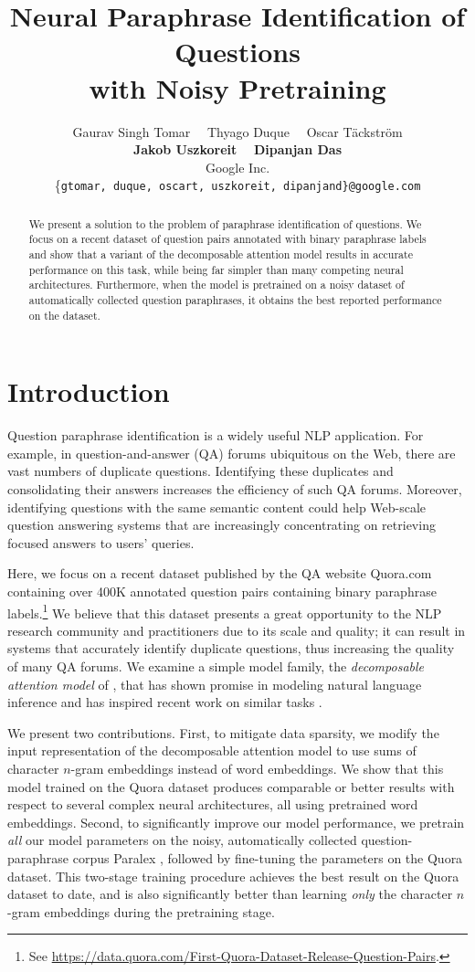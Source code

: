\documentclass[11pt,letterpaper]{article}
\title{Neural Paraphrase Identification of Questions\\with Noisy Pretraining}
\author{Gaurav Singh Tomar \ \ Thyago Duque \ \ Oscar T{\"{a}}ckstr{\"{o}}m \\ {\bf Jakob Uszkoreit} \ \ {\bf Dipanjan Das}\\Google Inc.\\ \{\texttt{gtomar, duque, oscart, uszkoreit, dipanjand\}}\texttt{@google.com}}
\date{}
\begin{document}
\maketitle

\begin{abstract}
We present a solution to the problem of paraphrase identification of questions.
We focus on a recent dataset of question pairs annotated with binary paraphrase labels and show that a variant of the decomposable attention model \cite{parikh.etal.2016} results in accurate performance on this task, while being far simpler than many competing neural architectures.
Furthermore, when the model is pretrained on a noisy dataset of automatically collected question paraphrases, it obtains the best reported performance on the dataset.
\end{abstract}

\section{Introduction}
Question paraphrase identification is a widely useful NLP application.
For example, in question-and-answer (QA) forums ubiquitous on the Web, there are vast numbers of duplicate questions.
Identifying these duplicates and consolidating their answers increases the efficiency of such QA forums.
Moreover, identifying questions with the same semantic content could help Web-scale question answering systems that are increasingly concentrating on retrieving focused answers to users' queries.

Here, we focus on a recent dataset published by the QA website Quora.com containing over 400K annotated question pairs containing binary paraphrase labels.\footnote{See \url{https://data.quora.com/First-Quora-Dataset-Release-Question-Pairs}.}  We believe that this dataset presents a great opportunity to the NLP research community and practitioners due to its scale and quality; it can result in systems that accurately identify duplicate questions, thus increasing the quality of many QA forums.  We examine a simple model family, the \emph{decomposable attention model} of , that has shown promise in modeling natural language inference and has inspired recent work on similar tasks \cite{ChenZLWJ16,kim:iclr2017}.

We present two contributions.  First, to mitigate data sparsity, we modify the input representation of the decomposable attention model to use sums of character $n$-gram embeddings instead of word embeddings.  We show that this model trained on the Quora dataset produces comparable or better results with respect to several complex neural architectures, all using pretrained word embeddings.  Second, to significantly improve our model performance, we pretrain \textit{all} our model parameters on the noisy, automatically collected question-paraphrase corpus Paralex \cite{paralex}, followed by fine-tuning the parameters on the Quora dataset.  This two-stage training procedure achieves the best result on the Quora dataset to date, and is also significantly better than learning \textit{only} the character $n$-gram embeddings during the pretraining stage.
\end{document}
